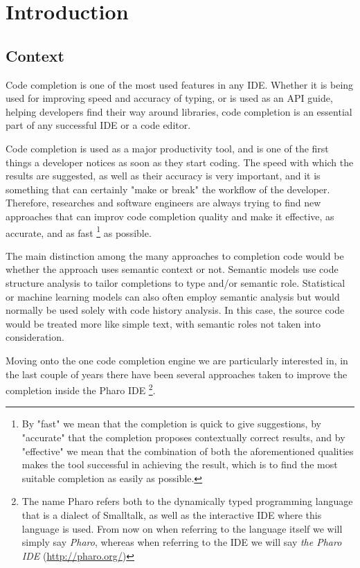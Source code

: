 \chapter{Introduction}
\label{chap:Introduction}

\section{Context}
\label{sec:Introduction-Context}
Code completion is one of the most used features in any IDE. Whether it is being used for improving speed and accuracy of typing, or is used as an API guide, helping developers find their way around libraries, code completion is an essential part of any successful IDE or a code editor.

Code completion is used as a major productivity tool, and is one of the first things a developer notices as soon as they start coding. The speed with which the results are suggested, as well as their accuracy is very important, and it is something that can certainly "make or break" the workflow of the developer. Therefore, researches and software engineers are always trying to find new approaches that can improv code completion quality and make it effective, as accurate, and as fast \footnote{By "fast" we mean that the completion is quick to give suggestions, by "accurate" that the completion proposes contextually correct results, and by "effective" we mean that the combination of both the aforementioned qualities makes the tool successful in achieving the result, which is to find the most suitable completion as easily as possible.} as possible.

The main distinction among the many approaches to completion code would be whether the approach uses semantic context or not. Semantic models use code structure analysis to tailor completions to type and/or semantic role. Statistical or machine learning models can also often employ semantic analysis but would normally be used solely with code history analysis. In this case, the source code would be treated more like simple text, with semantic roles not taken into consideration.

Moving onto the one code completion engine we are particularly interested in, in the last couple of years there have been several approaches taken to improve the completion inside the Pharo IDE \footnote{The name Pharo refers both to the dynamically typed programming language that is a dialect of Smalltalk, as well as the interactive IDE where this language is used. \newline From now on when referring to the language itself we will simply say \textit{Pharo}, whereas when referring to the IDE we will say \textit{the Pharo IDE} (\url{http://pharo.org/})}.

